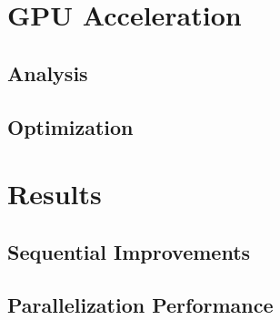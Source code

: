 \documentclass[fleqn,11pt]{SelfArx} %
\begin{document}
\section{GPU Acceleration}

\subsection{Analysis}

\subsection{Optimization}


\section{Results}

\subsection{Sequential Improvements}

\subsection{Parallelization Performance}
\end{document}
